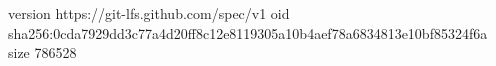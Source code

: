 version https://git-lfs.github.com/spec/v1
oid sha256:0cda7929dd3c77a4d20ff8c12e8119305a10b4aef78a6834813e10bf85324f6a
size 786528
